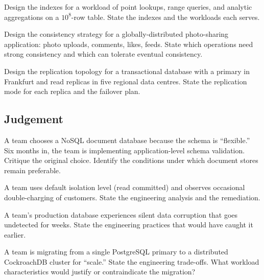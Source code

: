 \begin{exercise}
Design the indexes for a workload of point lookups, range queries, and analytic aggregations on a $10^8$-row table. State the indexes and the workloads each serves.
\end{exercise}

\begin{exercise}
Design the consistency strategy for a globally-distributed photo-sharing application: photo uploads, comments, likes, feeds. State which operations need strong consistency and which can tolerate eventual consistency.
\end{exercise}

\begin{exercise}
Design the replication topology for a transactional database with a primary in Frankfurt and read replicas in five regional data centres. State the replication mode for each replica and the failover plan.
\end{exercise}

\subsection*{Judgement}

\begin{exercise}
A team chooses a NoSQL document database because the schema is ``flexible.'' Six months in, the team is implementing application-level schema validation. Critique the original choice. Identify the conditions under which document stores remain preferable.
\end{exercise}

\begin{exercise}
A team uses default isolation level (read committed) and observes occasional double-charging of customers. State the engineering analysis and the remediation.
\end{exercise}

\begin{exercise}
A team's production database experiences silent data corruption that goes undetected for weeks. State the engineering practices that would have caught it earlier.
\end{exercise}

\begin{exercise}
A team is migrating from a single PostgreSQL primary to a distributed CockroachDB cluster for ``scale.'' State the engineering trade-offs. What workload characteristics would justify or contraindicate the migration?
\end{exercise}

